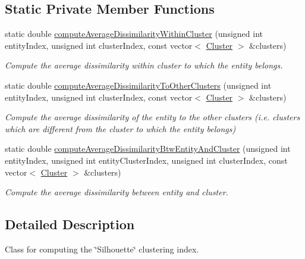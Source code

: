 \subsection*{Static Private Member Functions}
\begin{DoxyCompactItemize}
\item 
static double \hyperlink{classmultiscale_1_1analysis_1_1Silhouette_a9cfc58c766daf74d57c0f109f2e77639}{compute\-Average\-Dissimilarity\-Within\-Cluster} (unsigned int entity\-Index, unsigned int cluster\-Index, const vector$<$ \hyperlink{classmultiscale_1_1analysis_1_1Cluster}{Cluster} $>$ \&clusters)
\begin{DoxyCompactList}\small\item\em Compute the average dissimilarity within cluster to which the entity belongs. \end{DoxyCompactList}\item 
static double \hyperlink{classmultiscale_1_1analysis_1_1Silhouette_a32876a9d476298d1835486a334eee44f}{compute\-Average\-Dissimilarity\-To\-Other\-Clusters} (unsigned int entity\-Index, unsigned int cluster\-Index, const vector$<$ \hyperlink{classmultiscale_1_1analysis_1_1Cluster}{Cluster} $>$ \&clusters)
\begin{DoxyCompactList}\small\item\em Compute the average dissimilarity of the entity to the other clusters (i.\-e. clusters which are different from the cluster to which the entity belongs) \end{DoxyCompactList}\item 
static double \hyperlink{classmultiscale_1_1analysis_1_1Silhouette_aac5c29405d0407da2f21ffac016bfd01}{compute\-Average\-Dissimilarity\-Btw\-Entity\-And\-Cluster} (unsigned int entity\-Index, unsigned int entity\-Cluster\-Index, unsigned int cluster\-Index, const vector$<$ \hyperlink{classmultiscale_1_1analysis_1_1Cluster}{Cluster} $>$ \&clusters)
\begin{DoxyCompactList}\small\item\em Compute the average dissimilarity between entity and cluster. \end{DoxyCompactList}\end{DoxyCompactItemize}


\subsection{Detailed Description}
Class for computing the \char`\"{}\-Silhouette\char`\"{} clustering index. 

